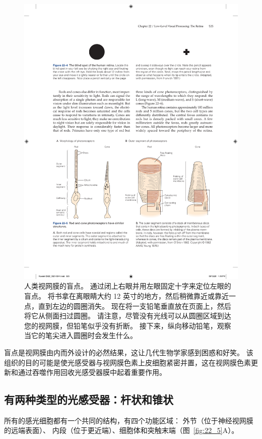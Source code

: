 \begin{figure}[htbp]
	\centering
	\includegraphics[width=0.7\linewidth]{chap22/fig_22_4}
	\caption{人类视网膜的盲点。
		通过闭上右眼并用左眼固定十字来定位左眼的盲点。
		将书拿在离眼睛大约 12 英寸的地方，然后稍微靠近或靠近一点，直到左边的圆圈消失。 
		现在将一支铅笔垂直放在页面上，然后将它从侧面扫过圆圈。 
		请注意，尽管没有光线可以从圆圈区域到达您的视网膜，但铅笔似乎没有折断。 
		接下来，纵向移动铅笔，观察当它的笔尖进入圆圈时会发生什么\cite{hurvich1981color}。}
	\label{fig:22_4}
\end{figure}


盲点是视网膜由内而外设计的必然结果，这让几代生物学家感到困惑和好笑。
该组织的目的可能是使光感受器与视网膜色素上皮细胞紧密并置，这在视网膜色素更新和通过吞噬作用回收光感受器膜中起着重要作用。


\subsection{有两种类型的光感受器：杆状和锥状}

所有的感光细胞都有一个共同的结构，有四个功能区域：
外节（位于神经视网膜的远端表面）、
内段（位于更近端）、细胞体和突触末端（图~\ref{fig:22_5}A）。


